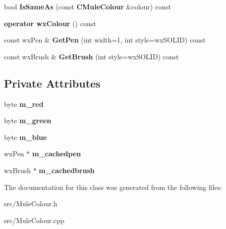 \begin{DoxyCompactItemize}
\item 
bool {\bfseries IsSameAs} (const {\bf CMuleColour} \&colour) const \label{classCMuleColour_a72dc2a0ca571aeb16548735852b6797f}

\item 
{\bfseries operator wxColour} () const \label{classCMuleColour_a81f026c56d5179f151541bed4fa4a42c}

\item 
const wxPen \& {\bfseries GetPen} (int width=1, int style=wxSOLID) const \label{classCMuleColour_a6ee7ed0dfc5f3d834a8c6bc691478f60}

\item 
const wxBrush \& {\bfseries GetBrush} (int style=wxSOLID) const \label{classCMuleColour_af3142e740386a4ddd3bfc94a2f63dbf5}

\end{DoxyCompactItemize}
\subsection*{Private Attributes}
\begin{DoxyCompactItemize}
\item 
byte {\bfseries m\_\-red}\label{classCMuleColour_a64d6f467e786bb32707aa6edc874a02a}

\item 
byte {\bfseries m\_\-green}\label{classCMuleColour_a4892ec3cd58d2bfc878ce75dceed03ee}

\item 
byte {\bfseries m\_\-blue}\label{classCMuleColour_a6358592a26987aa0e9fb3a6beb43126f}

\item 
wxPen $\ast$ {\bfseries m\_\-cachedpen}\label{classCMuleColour_a58bd56ded0504399ad9dd268e20be968}

\item 
wxBrush $\ast$ {\bfseries m\_\-cachedbrush}\label{classCMuleColour_a58a437c63edbbde3f022828e5310ac16}

\end{DoxyCompactItemize}


The documentation for this class was generated from the following files:\begin{DoxyCompactItemize}
\item 
src/MuleColour.h\item 
src/MuleColour.cpp\end{DoxyCompactItemize}
